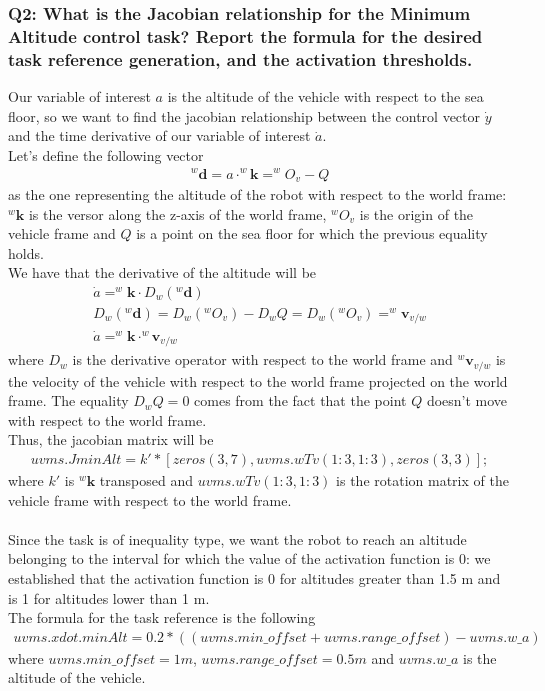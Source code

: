 \documentclass{article}
\begin{document}
\subsubsection{Q2: What is the Jacobian relationship for the Minimum Altitude control task? Report the formula for the desired task reference generation, and the activation thresholds.}
Our variable of interest $ a $ is the altitude of the vehicle with respect to the sea floor, so we want to find the jacobian relationship between the control vector $ \dot{y} $ and the time derivative of our variable of interest $ \dot{a} $. \\
Let's define the following vector
\begin{gather*}
	^{w}\boldsymbol{d} = a \cdot ^{w}\boldsymbol{k} = ^{w}O_{v} - Q
\end{gather*}
as the one representing the altitude of the robot with respect to the world frame:$ ^{w}\boldsymbol{k} $ is the versor along the z-axis of the world frame, $ ^{w}O_{v} $ is the origin of the vehicle frame and $ Q $ is a point on the sea floor for which the previous equality holds. \\
We have that the derivative of the altitude will be
\begin{gather*}
	\dot{a} = ^{w}\boldsymbol{k} \cdot D_{w}(^{w}\boldsymbol{d}) \\
	D_{w}(^{w}\boldsymbol{d}) = D_{w}(^{w}O_{v}) - D_{w}Q = D_{w}(^{w}O_{v}) = ^{w}\boldsymbol{v}_{v/w} \\
	\dot{a} = ^{w}\boldsymbol{k} \cdot ^{w}\boldsymbol{v}_{v/w}
\end{gather*}
where $ D_{w} $ is the derivative operator with respect to the world frame and $ ^{w}\boldsymbol{v}_{v/w} $ is the velocity of the vehicle with respect to the world frame projected on the world frame. The equality $ D_{w}Q = 0 $ comes from the fact that the point $ Q $ doesn't move with respect to the world frame. \\
Thus, the jacobian matrix will be
\begin{gather*}
	uvms.JminAlt = k' * [zeros(3, 7), uvms.wTv(1:3, 1:3), zeros(3, 3)];
\end{gather*}
where $ k' $ is $ ^{w}\boldsymbol{k} $ transposed and $ uvms.wTv(1:3, 1:3) $ is the rotation matrix of the vehicle frame with respect to the world frame. \\ \\
Since the task is of inequality type, we want the robot to reach an altitude belonging to the interval for which the value of the activation function is 0: we established that the activation function is 0 for altitudes greater than 1.5 m and is 1 for altitudes lower than 1 m. \\
The formula for the task reference is the following
\begin{gather*}
	uvms.xdot.minAlt = 0.2 * ((uvms.min\_offset + uvms.range\_offset) - uvms.w\_a)
\end{gather*}
where $ uvms.min\_offset = 1 m $, $ uvms.range\_offset = 0.5 m $ and $ uvms.w\_a $ is the altitude of the vehicle.
\end{document}
